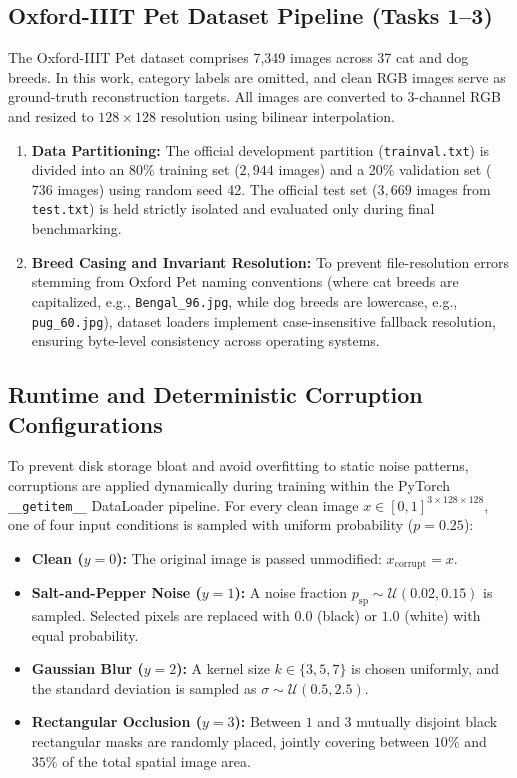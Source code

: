\documentclass[conference]{IEEEtran}
\begin{document}
\subsection{Oxford-IIIT Pet Dataset Pipeline (Tasks 1--3)}
The Oxford-IIIT Pet dataset comprises 7,349 images across 37 cat and dog breeds. In this work, category labels are omitted, and clean RGB images serve as ground-truth reconstruction targets. All images are converted to 3-channel RGB and resized to $128 \times 128$ resolution using bilinear interpolation.
\begin{enumerate}
    \item \textbf{Data Partitioning:} The official development partition (\texttt{trainval.txt}) is divided into an 80\% training set ($2,944$ images) and a 20\% validation set ($736$ images) using random seed 42. The official test set ($3,669$ images from \texttt{test.txt}) is held strictly isolated and evaluated only during final benchmarking.
    \item \textbf{Breed Casing and Invariant Resolution:} To prevent file-resolution errors stemming from Oxford Pet naming conventions (where cat breeds are capitalized, e.g., \texttt{Bengal\_96.jpg}, while dog breeds are lowercase, e.g., \texttt{pug\_60.jpg}), dataset loaders implement case-insensitive fallback resolution, ensuring byte-level consistency across operating systems.
\end{enumerate}

\subsection{Runtime and Deterministic Corruption Configurations}
To prevent disk storage bloat and avoid overfitting to static noise patterns, corruptions are applied dynamically during training within the PyTorch \texttt{\_\_getitem\_\_} DataLoader pipeline. For every clean image $x \in [0, 1]^{3 \times 128 \times 128}$, one of four input conditions is sampled with uniform probability ($p = 0.25$):
\begin{itemize}
    \item \textbf{Clean ($y=0$):} The original image is passed unmodified: $x_{\text{corrupt}} = x$.
    \item \textbf{Salt-and-Pepper Noise ($y=1$):} A noise fraction $p_{\text{sp}} \sim \mathcal{U}(0.02, 0.15)$ is sampled. Selected pixels are replaced with $0.0$ (black) or $1.0$ (white) with equal probability.
    \item \textbf{Gaussian Blur ($y=2$):} A kernel size $k \in \{3, 5, 7\}$ is chosen uniformly, and the standard deviation is sampled as $\sigma \sim \mathcal{U}(0.5, 2.5)$.
    \item \textbf{Rectangular Occlusion ($y=3$):} Between $1$ and $3$ mutually disjoint black rectangular masks are randomly placed, jointly covering between $10\%$ and $35\%$ of the total spatial image area.
\end{itemize}
\end{document}
